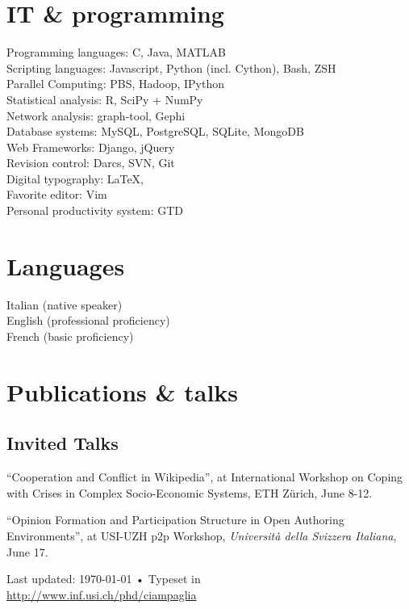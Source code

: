 \documentclass[10pt, a4paper]{article}
\newcommand{\years}[1]{\marginnote{\scriptsize #1}}
\begin{document}
\section*{IT \& programming}
Programming languages: C, Java, MATLAB\\
Scripting languages: Javascript, Python (incl. Cython), Bash, ZSH\\
Parallel Computing: PBS, Hadoop, IPython\\
Statistical analysis: R, SciPy + NumPy\\
Network analysis: graph-tool, Gephi\\
Database systems: MySQL, PostgreSQL, SQLite, MongoDB\\
Web Frameworks: Django, jQuery\\
Revision control: Darcs, SVN, Git\\
Digital typography: \LaTeX, \XeTeX\\
Favorite editor: Vim\\
Personal productivity system: GTD

\section*{Languages}
Italian (native speaker)\\
English (professional proficiency)\\
French (basic proficiency)

\section*{Publications \& talks}

\printbibliography[heading=subbibliography,title=Peer-reviewed publications,%
        category=peerreviewed]
\printbibliography[heading=subbibliography,title=Working papers, %
        category=workingpapers]
\printbibliography[heading=subbibliography,title=Theses,category=theses]

\subsection*{Invited Talks}

\years{2009} ``Cooperation and Conflict in Wikipedia'', at International
Workshop on Coping with Crises in Complex Socio-Economic Systems, ETH Z\"urich,
June 8-12.

\years{2009} ``Opinion Formation and Participation Structure in Open Authoring
Environments'', at USI-UZH p2p Workshop, \textsl{Università della Svizzera
Italiana},
June 17.

\vfill{}

\begin{center}
{\scriptsize  Last updated: \today\- •\- 
Typeset in { \XeTeX}\\
\href{http://www.inf.usi.ch/phd/ciampaglia}{http://www.inf.usi.ch/phd/ciampaglia}}
\end{center}
\end{document}
